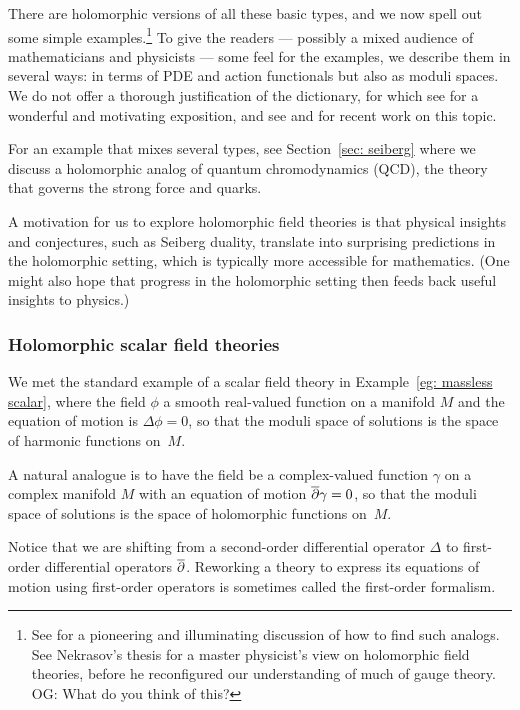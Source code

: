 \documentclass[11pt]{amsart}
\def\owen#1{{\textcolor{violet!50!black}{OG: {#1}}}}
\begin{document}
There are holomorphic versions of all these basic types, 
and we now spell out some simple examples.\footnote{See \cite{DonThom} for a pioneering and illuminating discussion of how to find such analogs. See Nekrasov's thesis \cite{NekThesis} for a master physicist's view on holomorphic field theories, before he  reconfigured our understanding of much of gauge theory. \owen{What do you think of this?}}
To give the readers --- possibly a mixed audience of mathematicians and physicists --- some feel for the examples, 
we describe them in several ways: 
in terms of PDE and action functionals but also as moduli spaces.
We do not offer a thorough justification of the dictionary, for which see \cite{CosSUSY} for a wonderful and motivating exposition,
and see \cite{AlfonsiYoung} and \cite{Steffens23} for recent work on this topic.

For an example that mixes several types, see Section~\ref{sec: seiberg}
where we discuss a holomorphic analog of quantum chromodynamics (QCD), the theory that governs the strong force and quarks.

A motivation for us to explore holomorphic field theories is that physical insights and conjectures, such as Seiberg duality, translate into surprising predictions in the holomorphic setting,
which is typically more accessible for mathematics.
(One might also hope that progress in the holomorphic setting then feeds back useful insights to physics.)

\subsubsection{Holomorphic scalar field theories}

We met the standard example of a scalar field theory in Example~\ref{eg: massless scalar},
where the field $\phi$ a smooth real-valued function on a manifold $M$
and the equation of motion is $\Delta \phi = 0$,
so that the moduli space of solutions is the space of harmonic functions on~$M$.

A natural analogue is to have the field be a complex-valued function $\gamma$ on a complex manifold $M$ with an equation of motion ${\overline{\partial}} \gamma = 0$,
so that the moduli space of solutions is the space of holomorphic functions on~$M$.

Notice that we are shifting from a second-order differential operator $\Delta$ to first-order differential operators ${\overline{\partial}}$.
Reworking a theory to express its equations of motion using first-order operators is sometimes called the first-order formalism.
\end{document}
